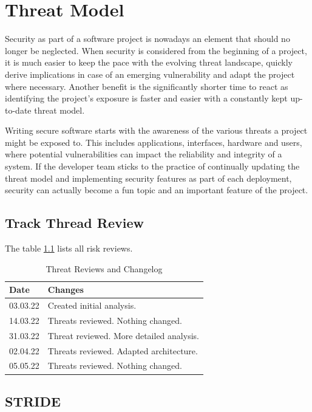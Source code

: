 \chapter{Threat Model}

Security as part of a software project is nowadays an element that should no longer be neglected. When security is considered from the beginning of a project, it is much easier to keep the pace with the evolving threat landscape, quickly derive implications in case of an emerging vulnerability and adapt the project where necessary. Another benefit is the significantly shorter time to react as identifying the project's exposure is faster and easier with a constantly kept up-to-date threat model.

Writing secure software starts with the awareness of the various threats a project might be exposed to. This includes applications, interfaces, hardware and users, where potential vulnerabilities can impact the reliability and integrity of a system. If the developer team sticks to the practice of continually updating the threat model and implementing security features as part of each deployment, security can actually become a fun topic and an important feature of the project.

\section{Track Thread Review}
The table \ref{tab:threat-review} lists all risk reviews.

\begin{table}[h!]
  \centering
  \caption{\label{tab:threat-review}Threat Reviews and Changelog}
  \begin{tabular}{ | l | l | }
    \hline
    \textbf{Date} & \textbf{Changes} \\
    \hline
    03.03.22 & Created initial analysis. \\
    \hline
    14.03.22 & Threats reviewed. Nothing changed. \\
    \hline
    31.03.22 & Threat reviewed. More detailed analysis. \\
    \hline
    02.04.22 & Threats reviewed. Adapted architecture.\\
    \hline
    05.05.22 & Threats reviewed. Nothing changed. \\
    \hline
  \end{tabular}
\end{table}

\section{STRIDE}

